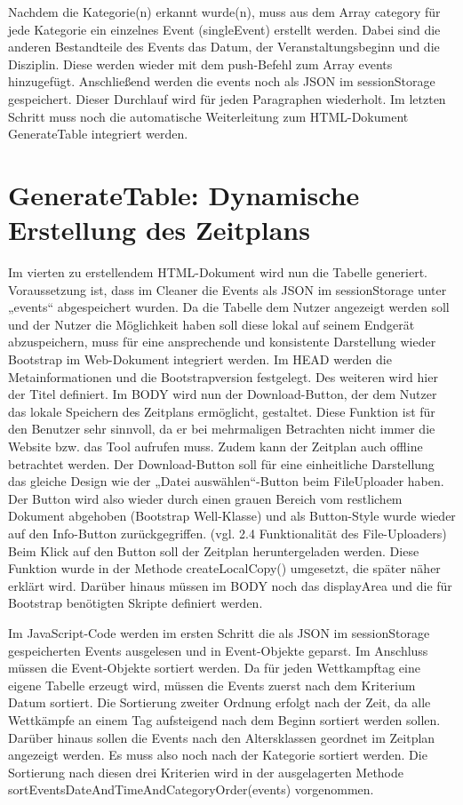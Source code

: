 {Nachdem die Kategorie(n) erkannt wurde(n), muss aus dem Array category für jede Kategorie ein einzelnes Event (singleEvent) erstellt werden. Dabei sind die anderen Bestandteile des Events das Datum, der Veranstaltungsbeginn und die Disziplin. Diese werden wieder mit dem push-Befehl zum Array events hinzugefügt. Anschließend werden die events noch als JSON im sessionStorage gespeichert. 
Dieser Durchlauf wird für jeden Paragraphen wiederholt.
Im letzten Schritt muss noch die automatische Weiterleitung zum HTML-Dokument GenerateTable integriert werden.

\section{GenerateTable: Dynamische Erstellung des Zeitplans}

Im vierten zu erstellendem HTML-Dokument wird nun die Tabelle generiert. Voraussetzung ist, dass im Cleaner die Events als JSON im sessionStorage unter „events“ abgespeichert wurden.
Da die Tabelle dem Nutzer angezeigt werden soll und der Nutzer die Möglichkeit haben soll diese lokal auf seinem Endgerät abzuspeichern, muss für eine ansprechende und konsistente Darstellung wieder Bootstrap im Web-Dokument integriert werden.
Im HEAD werden die Metainformationen und die Bootstrapversion festgelegt. Des weiteren wird hier der Titel definiert. 
Im BODY wird nun der Download-Button, der dem Nutzer das lokale Speichern des Zeitplans ermöglicht, gestaltet. Diese Funktion ist für den Benutzer sehr sinnvoll, da er bei mehrmaligen Betrachten nicht immer die Website bzw. das Tool aufrufen muss. Zudem kann der Zeitplan auch offline betrachtet werden. Der Download-Button soll für eine einheitliche Darstellung das gleiche Design wie der „Datei auswählen“-Button beim FileUploader haben. Der Button wird also wieder durch einen grauen Bereich vom restlichem Dokument abgehoben (Bootstrap Well-Klasse) und als Button-Style wurde wieder auf den Info-Button zurückgegriffen. (vgl. 2.4 Funktionalität des File-Uploaders) Beim Klick auf den Button soll der Zeitplan heruntergeladen werden. Diese Funktion wurde in der Methode createLocalCopy() umgesetzt, die später näher erklärt wird. Darüber hinaus müssen im BODY noch das displayArea und die für Bootstrap benötigten Skripte definiert werden.

Im JavaScript-Code werden im ersten Schritt die als JSON im sessionStorage gespeicherten Events ausgelesen und in Event-Objekte geparst. Im Anschluss müssen die Event-Objekte sortiert werden. Da für jeden Wettkampftag eine eigene Tabelle erzeugt wird, müssen die Events zuerst nach dem Kriterium Datum sortiert. Die Sortierung zweiter Ordnung erfolgt nach der Zeit, da alle Wettkämpfe an einem Tag aufsteigend nach dem Beginn sortiert werden sollen. Darüber hinaus sollen die Events nach den Altersklassen geordnet im Zeitplan angezeigt werden. Es muss also noch nach der Kategorie sortiert werden. Die Sortierung nach diesen drei Kriterien wird in der ausgelagerten Methode sortEventsDateAndTimeAndCategoryOrder(events) vorgenommen.

}
